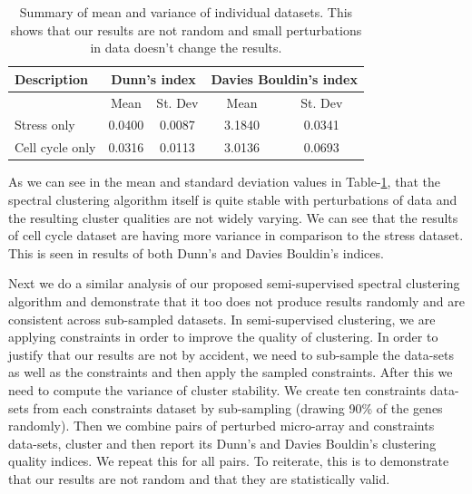 \begin{table}
\centering
\begin{tabular}{|l|c|c|c|c|}
\hline
Description & \multicolumn{2}{|c|}{Dunn’s index}  & \multicolumn{2}{|c|}{Davies Bouldin’s index}\\
\hline
 & Mean & St. Dev & Mean & St. Dev\\
\hline
Stress only  & 0.0400 & 0.0087 & 3.1840 & 0.0341 \\
Cell cycle only & 0.0316 & 0.0113 & 3.0136 & 0.0693 \\
\hline 
\end{tabular}
\caption{Summary of mean and variance of individual datasets. This shows that our results are not random and small perturbations in data doesn’t change the results.}
\label{tab:stress_ccycle_perturb}
\end{table}

As we can see in the mean and standard deviation values in Table-\ref{tab:stress_ccycle_perturb}, that the spectral clustering algorithm itself is quite stable with perturbations of 
data and the resulting cluster qualities are not widely varying. We can see that the results of cell cycle dataset are having more variance in comparison to the stress dataset. This is seen in results of both Dunn's and Davies Bouldin's indices.

Next we do a similar analysis of our proposed semi-supervised spectral clustering algorithm and demonstrate that it too does not produce results randomly and are consistent across sub-sampled datasets. In semi-supervised clustering, we are applying constraints in order to improve the quality 
of clustering. In order to justify that our results are not by accident, we need to sub-sample the data-sets as well as the constraints and then apply the sampled constraints. After this we need to compute the 
variance of cluster stability. We create ten constraints data-sets from each constraints dataset by sub-sampling (drawing 90\% of the genes randomly). Then we combine pairs of perturbed micro-array and constraints data-sets, 
cluster and then report its Dunn’s and Davies Bouldin's clustering quality indices. We repeat this for all pairs. To reiterate, this is to demonstrate that our results are not 
random and that they are statistically valid.

